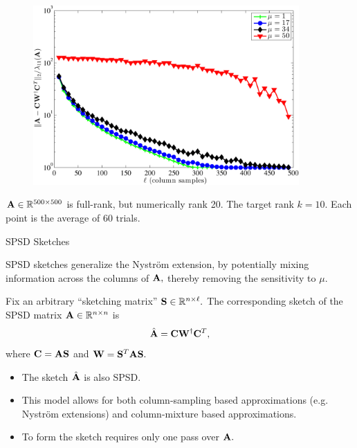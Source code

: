 \documentclass[xcolor=x11names,compress,ignorenonframetext,10pt]{beamer}
\renewcommand{\(}{\begin{columns}}
\renewcommand{\)}{\end{columns}}
\newcommand{\<}[1]{\begin{column}{#1}}
\renewcommand{\>}{\end{column}}
\begin{document}
  \begin{frame}
  
 \begin{figure}[h]
 \centering
 \centerline{\includegraphics[width=4in,keepaspectratio=true]{figures/spsd/nystromcoherencedependence}} 
 \end{figure}
 \vspace{-2em}
$\mathbf{A} \in \mathbb{R}^{500 \times 500}$ is full-rank, but numerically rank 20. The target rank $k = 10.$
Each point is the average of 60 trials.


\end{frame}

 \begin{frame}{SPSD Sketches}
 
 SPSD sketches generalize the Nystr\"om extension, by potentially mixing information across the columns of $\mathbf{A},$ 
 thereby removing the sensitivity to $\mu.$
 \vspace{0.7em}
 
 Fix an arbitrary ``sketching matrix'' $\mathbf{S} \in \mathbb{R}^{n \times \ell}.$ The corresponding sketch of the SPSD matrix $\mathbf{A} \in \mathbb{R}^{n \times n}$
 is
  \[
   \hat{\mathbf{A}} = \mathbf{C} \mathbf{W}^\dagger \mathbf{C}^T,
  \]
  where $\mathbf{C} = \mathbf{A}\mathbf{S}$ and $\mathbf{W} = \mathbf{S}^T \mathbf{A} \mathbf{S}.$
  
  \begin{itemize}
   \item The sketch $\hat{\mathbf{A}}$ is also SPSD.
   \item This model allows for both column-sampling based approximations (e.g. Nystr\"om extensions) and column-mixture
  based approximations. 
   \item To form the sketch requires only one pass over $\mathbf{A}.$
  \end{itemize}
  
\end{frame}
 
\end{document}
